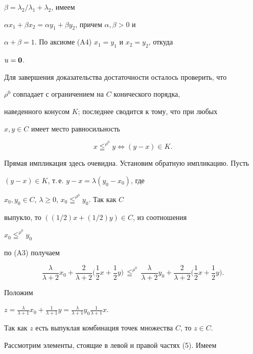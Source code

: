 $\beta=\lambda_2/\lambda_1+\lambda_2$, имеем 


$\alpha x_1+\beta x_2=\alpha y_1+\beta y_2$, причем $\alpha,\beta>0$ и 


$\alpha+\beta=1$. По аксиоме (A4) $x_1=y_1$ и $x_2=y_2$, откуда 


$u=\bold 0$. 


 


Для завершения доказательства достаточности осталось проверить, что 


$\rho^0$ совпадает с ограничением на $C$ конического порядка, 


наведенного конусом $K$; последнее сводится к тому, что при любых 


$x,y\in C$ имеет место равносильность 


$$ 


x\leqq^{\rho^0}y\Longleftrightarrow(y-x)\in K. 


$$ 


 


Прямая импликация здесь очевидна. Установим обратную импликацию. Пусть 


$(y-x)\in K$, т.\,е. $y-x=\lambda(y_0-x_0)$, где 


$x_0,y_0\in C$, $\lambda\ge 0$, $x_0\leqq^{\rho^0}y_0$. Так как $C$ 


выпукло, то $((1/2)x+(1/2)y)\in C$, из соотношения 


$x_0\leqq^{\rho^0}y_0$ 


по (A3) получаем 


\begin{equation} 


\frac{\lambda}{\lambda+2}x_0+\frac{2}{\lambda+2} 


\biggl(\frac{1}{2}x+\frac{1}{2}y\biggr)\,\leqq^{\rho^0}\, 


\frac{\lambda}{\lambda+2}y_0+\frac{2}{\lambda+2} 


\biggl(\frac{1}{2}x+\frac{1}{2}y \biggr). 


\end{equation} 


Положим 


$z=\frac{\lambda}{\lambda+1}x_0+\frac{1}{\lambda+1}y= 


\frac{\lambda}{\lambda+1}y_0\frac{1}{\lambda+1}x$. 


Так как $z$ есть выпуклая комбинация точек множества $C$, то $z\in C$. 


Рассмотрим элементы, стоящие в левой и правой частях (5). Имеем 


